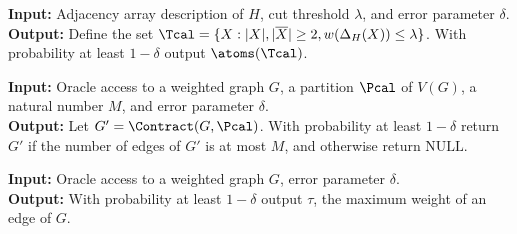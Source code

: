 \begin{algorithm}[H]
\caption{LearnCutAtoms$(H,\lambda, \delta)$}
 \hspace*{\algorithmicindent} \textbf{Input:} Adjacency array description of $H$, cut threshold $\lambda$, and error parameter $\delta$. \\
 \hspace*{\algorithmicindent} \textbf{Output:}
 Define the set $\Tcal = \{ X: |X|, |\overline{X}| \ge 2, w(\Delta_H(X)) \le \lambda \}$.
 With probability at least $1-\delta$ output $\atoms(\Tcal)$.
\end{algorithm}

\begin{algorithm}[H]
\caption{LearnContraction$[G](\Pcal, M, \delta)$}
\label{alg:contract}
 \hspace*{\algorithmicindent} \textbf{Input:} Oracle access to a weighted graph $G$, a partition $\Pcal$ of $V(G)$, a natural number $M$, and error parameter $\delta$. \\
 \hspace*{\algorithmicindent} \textbf{Output:} Let $G' = \Contract(G,\Pcal)$.  With probability at least $1-\delta$ return $G'$ if the number of edges of $G'$ is at most $M$, 
 and otherwise return $\mathrm{NULL}$.
\end{algorithm}

\begin{algorithm}[H]
\caption{FindMaxWeight$[G](\delta)$}
\label{alg:maxweight}
 \hspace*{\algorithmicindent} \textbf{Input:} Oracle access to a weighted graph $G$, error parameter $\delta$. \\
 \hspace*{\algorithmicindent} \textbf{Output:} With probability at least $1-\delta$ output $\tau$, the maximum weight of an edge of $G$.
\end{algorithm}

